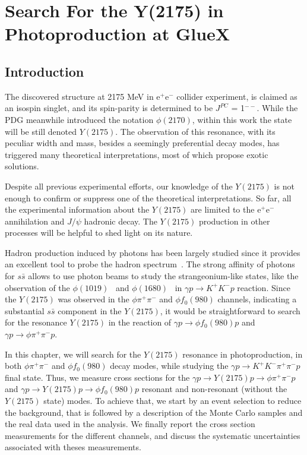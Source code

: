 \chapter{Search For the Y(2175) in Photoproduction at GlueX}
\label{chap.y2175}

\section{Introduction}
\label{chap.y2175.intro}

The discovered structure at 2175 MeV in e$^+$e$^{-}$ collider experiment, is claimed as an isospin singlet, and its spin-parity is determined to be $J^{PC}$ = 1$^{--}$. While the PDG meanwhile introduced the notation $\phi(2170)$, within this work the state will be still denoted $Y(2175)$. The observation of this resonance, with its peculiar width and mass, besides a seemingly preferential decay modes, has triggered many theoretical interpretations, most of which propose exotic solutions. 
~\par Despite all previous experimental efforts, our knowledge of the $Y(2175)$ is not enough to confirm or suppress one of the theoretical interpretations. So far, all the experimental information about the $Y(2175)$ are limited to the e$^+$e$^{-}$ annihilation and $J/\psi$ hadronic decay. The $Y(2175)$ production in other processes will be helpful to shed light on its nature.
~\par Hadron production induced by photons has been largely studied since it provides an excellent tool to probe the hadron spectrum~\cite{Ballam68, Meyer70, Wang14, Wang17}. The strong affinity of photons for $s\bar{s}$ allows to use photon beams to study the strangeonium-like states, like the observation of the $\phi(1019)$~\cite{Mibe05} and $\phi(1680)$~\cite{Aston81} in $\gamma p \rightarrow K^{+}K^{-}p$ reaction. Since the $Y(2175)$ was observed in the $\phi \pi^{+}\pi^{-}$ and $\phi f_{0}(980)$ channels, indicating a substantial $s\bar{s}$ component in the $Y(2175)$, it would be straightforward to search for the resonance $Y(2175)$ in the reaction of $\gamma p \rightarrow \phi f_{0}(980)p$ and $\gamma p \rightarrow \phi \pi^{+}\pi^{-}p$.
~\par In this chapter, we will search for the $Y(2175)$ resonance in photoproduction, in both $\phi \pi^{+}\pi^{-}$ and $\phi f_{0}(980)$ decay modes, while studying the $\gamma p \rightarrow K^{+}K^{-} \pi^{+}\pi^{-} p$ final state. Thus, we measure cross sections for the $\gamma p \rightarrow Y(2175) p \rightarrow \phi \pi^+ \pi^{-} p$ and $\gamma p \rightarrow Y(2175) p \rightarrow \phi f_{0}(980) p$ resonant and non-resonant (without the $Y(2175)$ state) modes. To achieve that, we start by an event selection to reduce the background, that is followed by a description of the Monte Carlo samples and the real data used in the analysis. We finally report the cross section measurements for the different channels, and discuss the systematic uncertainties associated with theses measurements.

